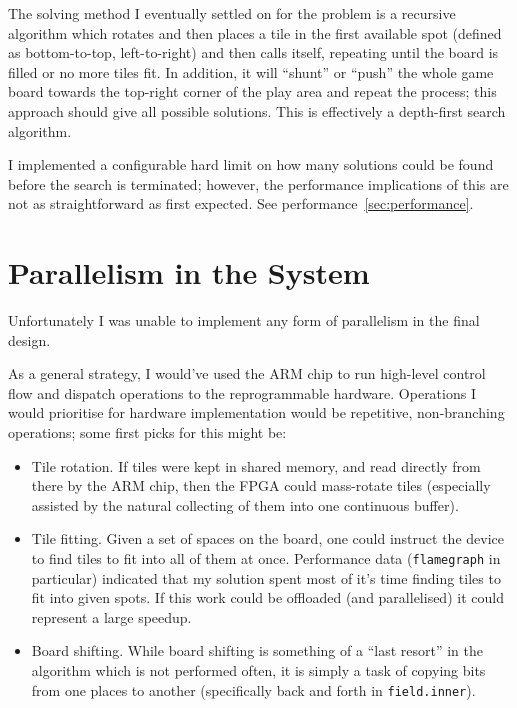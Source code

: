 \documentclass[11pt]{article}
\begin{document}
The solving method I eventually settled on for the problem is a recursive algorithm which rotates and then places a tile in the first available spot (defined as bottom-to-top, left-to-right) and then calls itself, repeating until the board is filled or no more tiles fit.
In addition, it will ``shunt'' or ``push'' the whole game board towards the top-right corner of the play area and repeat the process; this approach should give all possible solutions.
This is effectively a depth-first search algorithm.

I implemented a configurable hard limit on how many solutions could be found before the search is terminated; however, the performance implications of this are not as straightforward as first expected.
See performance~\ref{sec:performance}.

\section{Parallelism in the System}


Unfortunately I was unable to implement any form of parallelism in the final design.

As a general strategy, I would've used the ARM chip to run high-level control flow and dispatch operations to the reprogrammable hardware.
Operations I would prioritise for hardware implementation would be repetitive, non-branching operations; some first picks for this might be:

\begin{itemize}
  \item Tile rotation.
    If tiles were kept in shared memory, and read directly from there by the ARM chip, then the FPGA could mass-rotate tiles (especially assisted by the natural collecting of them into one continuous buffer).
  \item Tile fitting.
    Given a set of spaces on the board, one could instruct the device to find tiles to fit into all of them at once.
    Performance data (\verb|flamegraph| in particular) indicated that my solution spent most of it's time finding tiles to fit into given spots.
    If this work could be offloaded (and parallelised) it could represent a large speedup.
  \item Board shifting.
    While board shifting is something of a ``last resort'' in the algorithm which is not performed often, it is simply a task of copying bits from one places to another (specifically back and forth in \verb|field.inner|).
\end{itemize}
\end{document}

